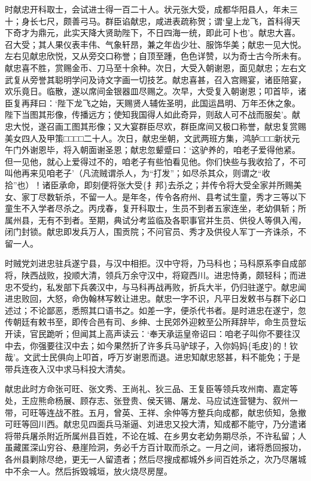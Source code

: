 \documentclass[]{article}
\begin{document}
时献忠开科取士，会试进士得一百二十人。状元张大受，成都华阳县人，年未三十；身长七尺，颇善弓马。群臣谄献忠，咸进表疏称贺；谓`皇上龙飞，首科得天下奇才为鼎元，此实天降大贤助陛下，不日四海一统，即此可卜也'。献忠大喜。召大受；其人果仪表丰伟、气象轩昂，兼之年齿少壮、服饰华美；献忠一见大悦。左右见献忠欣悦，又从旁交口称誉；自顶至踵，色色详赞，以为奇士古今所未有。献忠喜不胜，赏赐金币、刀马至十余种。次日，大受入朝谢恩，面见献忠；左右文武复从旁誉其聪明学问及诗文字画一切技艺。献忠喜甚，召入宫赐宴，诸臣陪宴，欢乐竟日。临散，遂以席间金银器皿尽赐之。次早，大受复入朝谢恩；叩首毕，诸臣复再拜曰：`陛下龙飞之始，天赐贤人辅佐圣明，此国运昌明、万年丕休之象。陛下当图其形像，传播远方；使知我国得人如此奇异，则敌人可不战而服矣'。献忠大悦，遂召画工图其形像；又大宴群臣尽欢，群臣席间又极口称誉，献忠复赏赐美女四人及甲策□□□□二十人。次日，献忠坐朝，文武两班方集，鸿胪□□□新状元午门外谢恩毕，将入朝面谢圣恩；献忠忽颦蹙曰：`这驴养的，咱老子爱得他紧。但一见他，就心上爱得过不的，咱老子有些怕看见他。你们快些与我收拾了，不可叫他再来见咱老子'（凡流贼谓杀人，为``打发''；如尽杀其众，则谓之``收拾''也）！诸臣承命，即刻便将张大受\{扌邦\}去杀之；并传令将大受全家并所赐美女、家丁尽数斩杀，不留一人。是年冬，传令各府州、县考试生童，秀才三等以下童生不入学者尽杀之。丙戌春，复开科取士，生员不到者五家连坐，老幼俱斩；所属州县，无有不到者。至期，典试分考监临及各职事官并生员、供役人等俱入闱，闭门封锁。献忠即发兵万人，围贡院；不问官员、秀才及供役人军丁一齐诛杀，不留一人。

时贼党刘进忠驻兵遂宁县，与汉中相拒。汉中守将，乃马科也；马科原系李自成部将，陕西战败，投顺大清，领兵万余守汉中，将窥西川。进忠恃勇，颇轻科；而进忠不受约，私发部下兵袭汉中，与马科再战再败，折兵大半，仍归驻遂宁。献忠闻进忠败回，大怒，命伪翰林写敕让进忠。献忠一字不识，凡平日发敕书与群下必口述过；不论鄙恶，悉照其口语书之。如差一字，便杀代书者。是时进忠在遂宁，忽传朝廷有敕书至，即传合邑有司、乡绅、士民郊外迎敕至公所拜辞毕，命生员登坛开读，官民跪听；但闻其上高声读云：`奉天承运皇帝诏曰：咱老子叫你不要往汉中去，你强要往汉中去；如今果然折了许多兵马驴球子，入你妈妈\{毛皮\}的！钦哉'。文武士民俱向上叩首，呼万岁谢恩而退。进忠知献忠怒甚，料不能免；于是带兵连夜入汉中求马科投大清矣。

献忠此时方命张可旺、张文秀、王尚礼、狄三品、王复臣等领兵攻州南、嘉定等处，王应熊命杨展、顾存志、张登贵、侯天锡、屠龙、马应试连营犍为、叙州一带，可旺等连战不胜。五月，曾英、王祥、余仲等方整兵向成都，献忠侦知，急撤可旺等回川西。献忠见四面兵马渐逼、刘进忠又投大清，知成都不能守，乃分遣诸将带兵屠杀附近所属州县百姓，不论在城、在乡男女老幼务期尽杀，不许私留；人虽藏匿深山穷谷、悬崖险洞，务必千方百计取而杀之。一月之间，诸将悉回报功，各州县剿除尽绝，更无一人留遗者；然后尽搜成都城外乡间百姓杀之，次乃尽屠城中不余一人。然后拆毁城垣，放火烧尽房屋。
\end{document}
